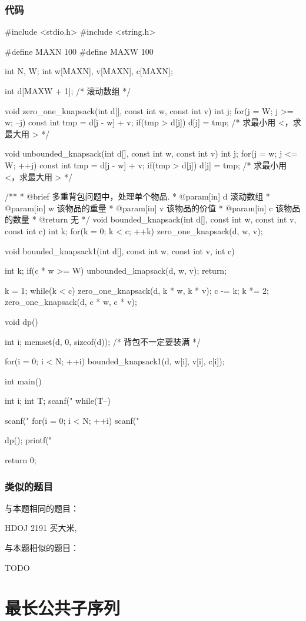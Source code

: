 \subsubsection{代码}
\begin{Codex}[label=bkp.c]
#include <stdio.h>
#include <string.h>

#define MAXN 100
#define MAXW 100

int N, W;
int w[MAXN], v[MAXN], c[MAXN];

int d[MAXW + 1]; /* 滚动数组 */

void zero_one_knapsack(int d[], const int w, const int v) {
    int j;
    for(j = W; j >= w; --j) {
        const int tmp = d[j - w] + v;
        if(tmp > d[j]) d[j] = tmp;  /* 求最小用 <，求最大用 > */
    }
}

void unbounded_knapsack(int d[], const int w, const int v) {
    int j;
    for(j = w; j <= W; ++j) {
        const int tmp = d[j - w] + v;
        if(tmp > d[j]) d[j] = tmp; /* 求最小用 <，求最大用 > */
    }
}

/**
 * @brief 多重背包问题中，处理单个物品.
 * @param[in] d 滚动数组
 * @param[in] w 该物品的重量
 * @param[in] v 该物品的价值
 * @param[in] c 该物品的数量
 * @return 无
 */
void bounded_knapsack(int d[], const int w, const int v, const int c) {
    int k;
    for(k = 0; k < c; ++k) {
        zero_one_knapsack(d, w, v);
    }
}

void bounded_knapsack1(int d[], const int w, const int v, int c) {
    int k;
    if(c * w >= W) {
        unbounded_knapsack(d, w, v);
        return;
    }

    k = 1;
    while(k < c) {
        zero_one_knapsack(d, k * w, k * v);
        c -= k;
        k *= 2;
    }
    zero_one_knapsack(d, c * w, c * v);
}

void dp() {
    int i;
    memset(d, 0, sizeof(d)); /* 背包不一定要装满 */

    for(i = 0; i < N; ++i) bounded_knapsack1(d, w[i], v[i], c[i]);
}
 
int main() {
    int i;
    int T;
    scanf("%
    while(T--) {
        scanf("%
        for(i = 0; i < N; ++i) scanf("%

        dp();
        printf("%
    }
    return 0;
}
\end{Codex}

\subsubsection{类似的题目}
与本题相同的题目：
\begindot
\item HDOJ 2191 买大米, 
\myenddot

与本题相似的题目：
\begindot
\item TODO
\myenddot

\section{最长公共子序列} %